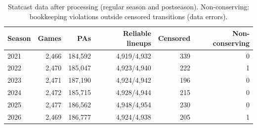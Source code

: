 \begin{table}[t]\centering\small
\caption{Statcast data after processing (regular season and postseason). Non-conserving: bookkeeping violations outside censored transitions (data errors).}\label{tab:data}
\begin{tabular}{lrrrrr}\toprule
Season & Games & PAs & Reliable lineups & Censored & Non-conserving\\\midrule
2021 & 2,466 & 184,592 & 4,919/4,932 & 339 & 0 \\
2022 & 2,470 & 185,047 & 4,923/4,940 & 222 & 1 \\
2023 & 2,471 & 187,190 & 4,924/4,942 & 196 & 0 \\
2024 & 2,472 & 185,715 & 4,928/4,944 & 215 & 0 \\
2025 & 2,477 & 186,562 & 4,948/4,954 & 230 & 0 \\
2026 & 2,469 & 186,777 & 4,924/4,938 & 205 & 1 \\
\bottomrule\end{tabular}\end{table}
